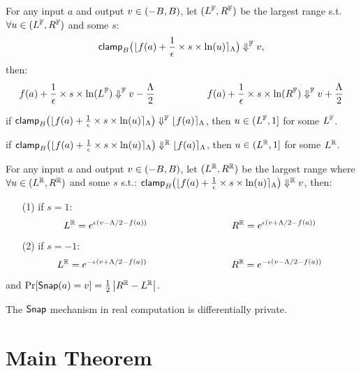 \documentclass[a4paper,11pt]{article}
\begin{document}
\begin{lem}[roundRL]
\label{lem:roundrl}
For any input $a$ and output $v \in (-B, B)$,
let $(L^{\mathbb{F}}, R^{\mathbb{F}})$ be the largest range s.t. 
$\forall u \in (L^{\mathbb{F}}, R^{\mathbb{F}})$ and some $s$:
%
$$
\mathsf{clamp}_B \big(
	\lfloor f(a) + \frac{1}{\epsilon} \times s \times \ln (u) \rceil_{\Lambda}
	\big)
	\Downarrow^{\mathbb{F}} v,$$
then:
$$
f(a) + \frac{1}{\epsilon} \times s \times 
\ln (L^{\mathbb{F}})
\Downarrow^{\mathbb{F}} v - \frac{\Lambda}{2}
~~~~~~~~~~~~~~~~
f(a) + \frac{1}{\epsilon} \times s \times 
\ln (R^{\mathbb{F}})
\Downarrow^{\mathbb{F}} v + \frac{\Lambda}{2}
$$
\end{lem}
\begin{lem}[roundId]
\label{lem:roundid}
if 
$\mathsf{clamp}_B \big(
	\lfloor f(a) + \frac{1}{\epsilon} \times s \times \ln (u) \rceil_{\Lambda}
	\big)
	\Downarrow^{\mathbb{F}} \lfloor f(a) \rceil_{\Lambda}$, then $u \in (L^{\mathbb{F}}, 1]$ for some $L^{\mathbb{F}}$.
\item
if
$\mathsf{clamp}_B \big(
	\lfloor f(a) + \frac{1}{\epsilon} \times s \times \ln (u) \rceil_{\Lambda}
	\big)
	\Downarrow^{\mathbb{R}} \lfloor f(a) \rceil_{\Lambda}$, then $u \in (L^{\mathbb{R}}, 1]$ for some $L^{\mathbb{R}}$.
\end{lem}
%
%
%
%
\begin{lem}[idealRL]
\label{lem:idealrl}
For any input $a$ and output $v \in (-B, B)$,
let $(L^{\mathbb{R}}, R^{\mathbb{R}})$ be the largest range where 
$\forall u \in (L^{\mathbb{R}}, R^{\mathbb{R}})$ and some $s$ s.t.:
%
$\mathsf{clamp}_B \big(
	\lfloor f(a) + \frac{1}{\epsilon} \times s \times \ln (u) \rceil_{\Lambda}
	\big)
\Downarrow^{\mathbb{R}} v
$, then:
%
\begin{itemize}
	\item[(1)] if $s = 1$:
$$
L^{\mathbb{R}} = e^{\epsilon(v - \Lambda/2 - f(a))}
~~~~~~~~~~~~~~~~~~~~~~~~~~
R^{\mathbb{R}} = e^{\epsilon(v + \Lambda/2 - f(a))}
$$
%
%
	\item[(2)] if $s = -1$:
	$$
L^{\mathbb{R}} = e^{-\epsilon(v + \Lambda/2 - f(a))}
~~~~~~~~~~~~~~~~~~~~~~~~~~
R^{\mathbb{R}} = e^{-\epsilon(v - \Lambda/2 - f(a))}
$$
%
\end{itemize}
and 
$\Pr[\mathsf{Snap}(a) = v] = \frac{1}{2}
\left\vert R^{\mathbb{R}} - L^{\mathbb{R}}\right \vert$.
%
\end{lem}
%
%
%
\begin{lem}[idealDP]
\label{lem:idealdp}
The $\mathsf{Snap}$ mechanism in real computation is differentially private.
\end{lem}

\newpage
\section{Main Theorem}
\end{document}
